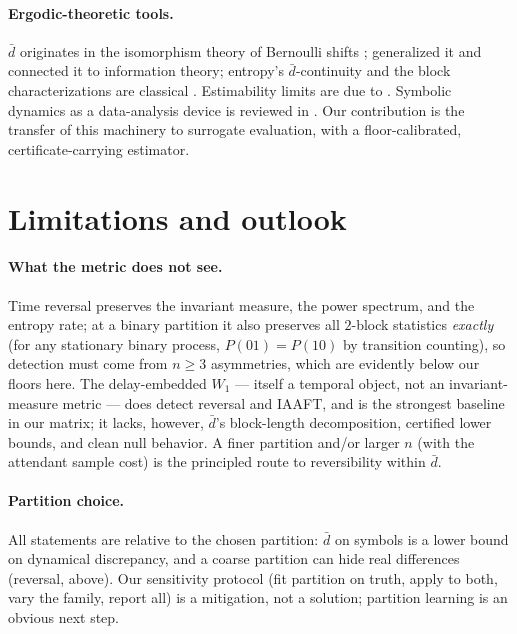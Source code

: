 \documentclass[11pt]{article}
\newcommand{\dbar}{\bar d}
\begin{document}
\paragraph{Ergodic-theoretic tools.} $\dbar$ originates in the isomorphism theory of
Bernoulli shifts \citep{ornstein1970bernoulli}; \citet{gray1975generalization}
generalized it and connected it to information theory; entropy's $\dbar$-continuity
and the block characterizations are classical \citep{shields1996ergodic}. Estimability
limits are due to \citet{ornstein1990sampling}. Symbolic dynamics as a data-analysis
device is reviewed in \citep{daw2003review}. Our contribution is the transfer of this
machinery to surrogate evaluation, with a floor-calibrated, certificate-carrying
estimator.

\section{Limitations and outlook}\label{sec:limits}

\paragraph{What the metric does not see.} Time reversal preserves the invariant
measure, the power spectrum, and the entropy rate; at a binary partition it also
preserves all $2$-block statistics \emph{exactly} (for any stationary binary process,
$P(01)=P(10)$ by transition counting), so detection must come from $n\ge3$ asymmetries,
which are evidently below our floors here. The delay-embedded $W_1$ --- itself a
temporal object, not an invariant-measure metric --- does detect reversal and IAAFT,
and is the strongest baseline in our matrix; it lacks, however, $\dbar$'s block-length
decomposition, certified lower bounds, and clean null behavior. A finer partition
and/or larger $n$ (with the attendant sample cost) is the principled route to
reversibility within $\dbar$.

\paragraph{Partition choice.} All statements are relative to the chosen partition:
$\dbar$ on symbols is a lower bound on dynamical discrepancy, and a coarse partition
can hide real differences (reversal, above). Our sensitivity protocol (fit partition on
truth, apply to both, vary the family, report all) is a mitigation, not a solution;
partition learning is an obvious next step.
\end{document}

